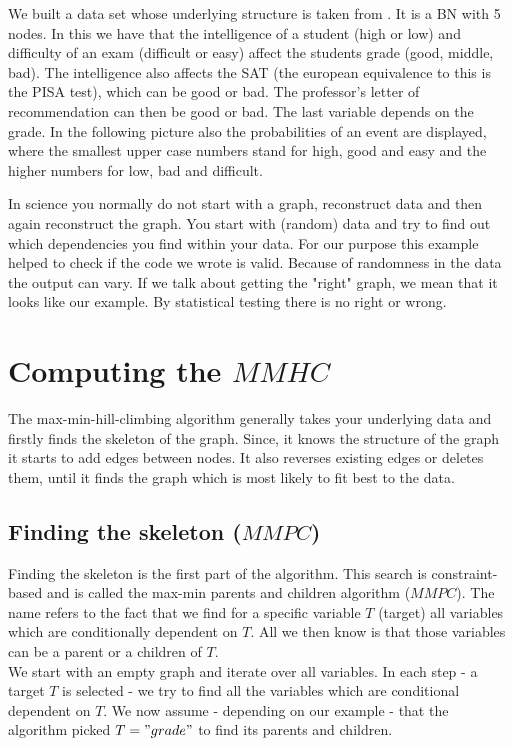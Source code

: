 		We built a data set whose underlying structure is taken from \cite{KoFr}. It is a BN with 5 nodes. In this we have that the intelligence of a student (high or low) and difficulty of an exam (difficult or easy) affect the students grade (good, middle, bad). The intelligence also affects the SAT (the european equivalence to this is the PISA test), which can be good or bad. The professor's letter of recommendation can then be good or bad. The last variable depends on the grade. In the following picture also the probabilities of an event are displayed, where the smallest upper case numbers stand for high, good and easy and the higher numbers for low, bad and difficult.

		 \label{img.exampleGraph}

		In science you normally do not start with a graph, reconstruct data and then again reconstruct the graph. You start with (random) data and try to find out which dependencies you find within your data. For our purpose this example helped to check if the code we wrote is valid. Because of randomness in the data the output can vary. If we talk about getting the "right" graph, we mean that it looks like our example. By statistical testing there is no right or wrong.

	\section{Computing the $MMHC$}

		The max-min-hill-climbing algorithm generally takes your underlying data and firstly finds the skeleton of the graph. Since, it knows the structure of the graph it starts to add edges between nodes. It also reverses existing edges or deletes them, until it finds the graph which is most likely to fit best to the data.

		\subsection*{Finding the skeleton ($MMPC$)}

			Finding the skeleton is the first part of the algorithm. This search is constraint-based and is called the max-min parents and children algorithm ($MMPC$). The name refers to the fact that we find for a specific variable $T$ (target) all variables which are conditionally dependent on $T$. All we then know is that those variables can be a parent or a children of $T$.\\
			We start with an empty graph and iterate over all variables. In each step - a target $T$ is selected - we try to find all the variables which are conditional dependent on $T$. We now assume - depending on our example - that the algorithm picked $T = "grade"$ to find its parents and children.

